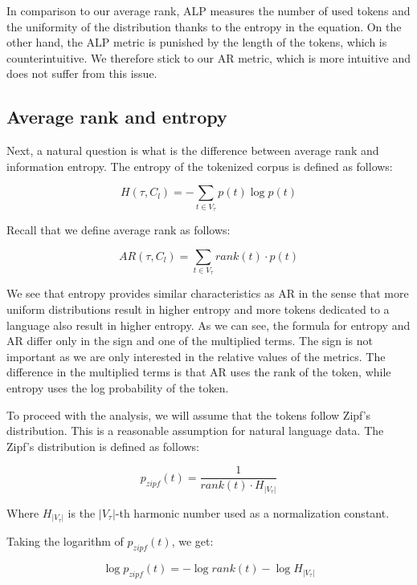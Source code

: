 In comparison to our average rank, ALP measures the number of used tokens and the uniformity of the distribution thanks to the entropy in the equation. On the other hand, the ALP metric is punished by the length of the tokens, which is counterintuitive. We therefore stick to our AR metric, which is more intuitive and does not suffer from this issue.

\subsection{Average rank and entropy}

Next, a natural question is what is the difference between average rank and information entropy. The entropy of the tokenized corpus is defined as follows:

\begin{equation}
    H(\tau, C_l) = - \sum_{t \in V_\tau} p(t) \log p(t)
\end{equation}

Recall that we define average rank as follows:

\begin{equation}
    AR(\tau, C_l) = \sum_{t \in V_\tau} rank(t) \cdot p(t)
\end{equation}

We see that entropy provides similar characteristics as AR in the sense that more uniform distributions result in higher entropy and more tokens dedicated to a language also result in higher entropy. As we can see, the formula for entropy and AR differ only in the sign and one of the multiplied terms. The sign is not important as we are only interested in the relative values of the metrics. The difference in the multiplied terms is that AR uses the rank of the token, while entropy uses the log probability of the token. 

To proceed with the analysis, we will assume that the tokens follow Zipf's distribution. This is a reasonable assumption for natural language data. The Zipf's distribution is defined as follows:

\begin{equation}
    p_{zipf}(t) = \frac{1}{rank(t) \cdot H_{|V_\tau|}}
\end{equation}

Where $H_{|V_\tau|}$ is the $|V_\tau|$-th harmonic number used as a normalization constant.

Taking the logarithm of $p_{zipf}(t)$, we get:

\begin{equation}
    \log p_{zipf}(t) = - \log rank(t) - \log H_{|V_\tau|}
\end{equation}

